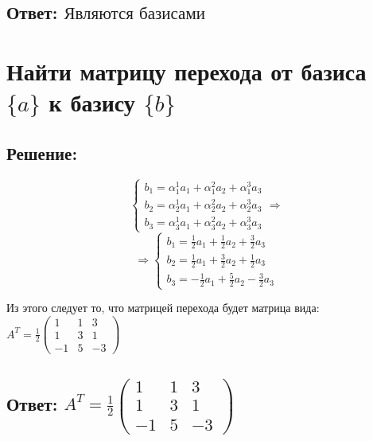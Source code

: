 \documentclass{article}
\begin{document}
        \subsection{Ответ: $\textbf{Являются базисами}$}

        \section{Найти матрицу перехода от базиса $\{a\}$ к базису $\{b\}$} 
        \subsection{Решение:}

        \[
        \begin{cases}
         b_1 = \alpha^{1}_1 a_1 + \alpha^{2}_1  a_2 + \alpha^{3}_1  a_3 \\
        b_2 = \alpha^{1}_2  a_1 + \alpha^{2}_2 a_2 + \alpha^{3}_2  a_3 \\
        b_3 = \alpha^{1}_3  a_1 + \alpha^{2}_3 a_2 + \alpha^{3}_3  a_3
        \end{cases}
        \Longrightarrow
        \]
        \[
        \Longrightarrow
        \begin{cases}
        b_1 = \frac{1}{2} a_1 + \frac{1}{2} a_2 + \frac{3}{2} a_3 \\
        b_2 = \frac{1}{2} a_1 + \frac{3}{2} a_2 + \frac{1}{2} a_3 \\
        b_3 = -\frac{1}{2} a_1 + \frac{5}{2} a_2 - \frac{3}{2} a_3
        \end{cases}
        \]
        
        Из этого следует то, что матрицей перехода будет матрица вида: \( A^T = \frac{1}{2} \begin{pmatrix}
        1 & 1 & 3 \\
        1 & 3 & 1 \\
        -1 & 5 & -3
        \end{pmatrix} \)

        \subsection{Ответ: $ A^T = \frac{1}{2} \begin{pmatrix}
        1 & 1 & 3 \\
        1 & 3 & 1 \\
        -1 & 5 & -3
        \end{pmatrix}$}
        
\end{document}
